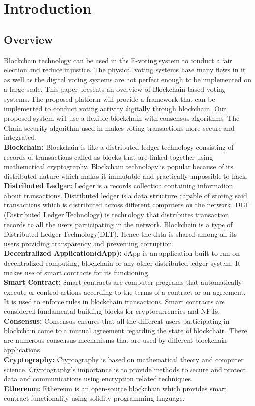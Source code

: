 \documentclass[oneside, 12pt]{book}
\begin{document}
\section{Introduction}
\newpage
\subsection{Overview}
Blockchain technology can be used in the E-voting system to conduct a fair election and reduce injustice. The physical voting systems have many flaws in it as well as the digital voting systems are not perfect enough to be implemented on a large scale. This paper presents an overview of Blockchain based voting systems. The proposed platform will provide a framework that can be implemented to conduct voting activity digitally through blockchain. Our proposed system will use a flexible blockchain with consensus algorithms. The Chain security algorithm used in makes voting transactions more secure and integrated.
\\\textbf{Blockchain:} Blockchain is like a distributed ledger technology consisting of records of transactions called as blocks that are linked together using mathematical cryptography. Blockchain technology is popular because of its distributed nature which makes it immutable and practically impossible to hack.
\\\textbf{Distributed Ledger:} Ledger is a records collection containing information about transactions. Distributed ledger is a data structure capable of storing said transactions which is distributed across different computers on the network. DLT (Distributed Ledger Technology) is technology that distributes transaction records to all the users participating in the network. Blockchain is a type of Distributed Ledger Technology(DLT). Hence the data is shared among all its users providing transparency and preventing corruption.
\\\textbf{Decentralized Application(dApp):} dApp is an application built to run on decentralized computing, blockchain or any other distributed ledger system. It makes use of smart contracts for its functioning.
\\\textbf{Smart Contract:} Smart contracts are computer programs that automatically execute or control actions according to the terms of a contract or an agreement. It is used to enforce rules in blockchain transactions. Smart contracts are considered fundamental building blocks for cryptocurrencies and NFTs.
\\\textbf{Consensus:} Consensus ensures that all the different users participating in blockchain come to a mutual agreement regarding the state of blockchain. There are numerous consensus mechanisms that are used by different blockchain applications.
\\\textbf{Cryptography:} Cryptography is based on mathematical theory and computer science. Cryptography’s importance is to provide methods to secure and protect data and communications using encryption related techniques.
\\\textbf{Ethereum:} Ethereum is an open-source blockchain which provides smart contract functionality using solidity programming language.
\newpage
\end{document}
